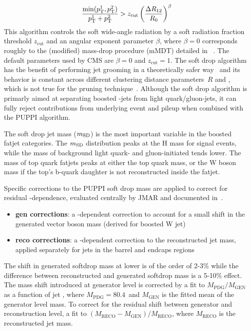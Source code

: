  $$\frac{\min(p_{\mathrm{T}}^1,p_{\mathrm{T}}^2)}{p_{\mathrm{T}}^1+p_{\mathrm{T}}^2} > z_{\mathrm{cut}} \left( \frac{\Delta R_{12}}{R_0} \right)^\beta$$
This algorithm controls the soft wide-angle radiation by a soft radiation fraction threshold $z_{\mathrm{cut}}$ and an angular exponent parameter $\beta$, where $\beta =0 $ corresponds roughly to the (modified) mass-drop procedure (mMDT) detailed in ~\cite{Dasgupta:2013ihk}. The default parameters used by CMS are $\beta=0$ and $z_{\mathrm{cut}}=1$.
The soft drop algorithm has the benefit of performing jet grooming in a theoretically safer way~\cite{Larkoski:2014wba,Larkoski:2013paa} and its behavior is constant across different clustering distance parameters~$R$ and \pt, which is not true for the pruning technique~\cite{Ellis:2009su,Ellis:2009me}.
Although the soft drop algorithm is primarly aimed at separating boosted \PW-jets from light quark/gluon-jets, it can fully reject contributions from underlying event and pileup when combined with the PUPPI algorithm.

The soft drop jet mass ($m_{\mathrm{SD}}$) is the most important variable in the boosted fatjet categories. 
The $m_{\mathrm{SD}}$ distribution peaks at the H mass for signal events, while the mass of background light quark- and gluon-initiated tends lower. 
The mass of top quark fatjets peaks at either the top quark mass, or the W boson mass if the top's b-quark daughter is not reconstructed inside the fatjet.

Specific corrections to the PUPPI soft drop mass are applied to correct for residual \pt-dependence, evaluated centrally by JMAR and documented in~\cite{AN-16-215}.
\begin{itemize}
  \item {\bf gen corrections}: a \pt-dependent correction to account for a small shift in the generated vector boson mass (derived for boosted W jet)
  \item {\bf reco corrections}: a \pt-dependent correction to the reconstructed jet mass, applied separately for jets in the barrel and endcaps regions
\end{itemize}

The shift in generated softdrop mass at lower \pt is of the order of 2-3\% while the difference between reconstructed and generated softdrop mass is a 5-10\% effect.
The mass shift introduced at generator level is corrected by a fit to $M_\textrm{PDG}/M_\textrm{GEN}$
as a function of jet \pt, where $M_\textrm{PDG} = 80.4$~\GeV and $M_\textrm{GEN}$ is the fitted mean of the generator level mass.
To correct for the residual shift between generator and reconstruction level, a fit to $(M_\textrm{RECO} − M_\textrm{GEN})/M_\textrm{RECO}$,
where $M_\textrm{RECO}$ is the reconstructed jet mass.


